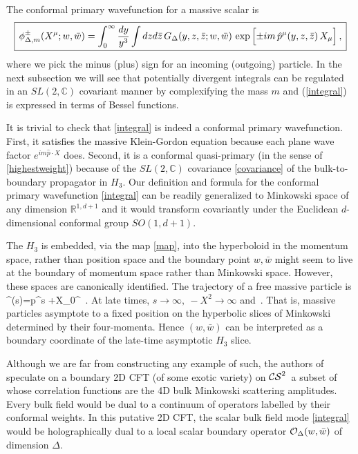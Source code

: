 \documentclass[12pt]{article}
\def\cst{${\cal CS}^2$}
\numberwithin{equation}{section}
\def\be#1\ee{\begin{align}#1\end{align}}
\begin{document}
The conformal primary wavefunction for a massive scalar is 
\begin{align}\label{integral}
\boxed{\,
\phi^\pm_{\Delta,m} (X^\mu; w, \bar w) 
= \int_0^\infty   {dy \over y^3} \int dzd\bar z  \, 
G_\Delta (y ,z,\bar z;w, \bar w)  \,
\exp\Big[   { \pm i m \,\hat p^\mu(y,z,\bar z)\, X_\mu}   \Big]\,,\,}
\end{align}
where we pick the  minus (plus) sign for an incoming (outgoing) particle.   In the next subsection we will see that potentially divergent integrals can be regulated in an $SL(2,\mathbb{C})$ covariant manner by complexifying the mass $m$ and (\ref{integral}) is expressed in terms of Bessel functions.


It is trivial to check that \eqref{integral} is indeed a conformal primary wavefunction. First, it satisfies the massive Klein-Gordon equation because each plane wave factor $e^{i m \hat p\cdot X}$ does. Second, it is a conformal quasi-primary (in the sense of \eqref{highestweight}) because of the $SL(2,\mathbb{C})$ covariance \eqref{covariance} of the  bulk-to-boundary propagator in $H_3$.    
Our definition and formula for the conformal primary wavefunction \eqref{integral} can be readily  generalized to Minkowski space of any dimension $\mathbb{R}^{1,d+1}$ and it would transform covariantly under the Euclidean $d$-dimensional conformal group $SO(1,d+1)$.


The $H_3$  is embedded, via the map \eqref{map}, into the hyperboloid in the momentum space, rather than position space and the boundary point $w,\bar w$ might seem to live at the boundary of momentum space rather than Minkowski space. However, these spaces are canonically identified. The trajectory of a free massive particle is 
\be X^\mu(s)=\hat p^\mu s +X_0^\mu\, .\ee
At late times, $s \to \infty,~-X^2\to \infty$ and 
\be {X^\mu \over \sqrt{-X^2}}\,.\ee
That is, massive particles asymptote to a fixed position on the hyperbolic slices of Minkowski determined by their four-momenta. Hence $(w,\bar w)$ can be interpreted as a boundary coordinate of the late-time asymptotic $H_3$ slice.

Although we are far from constructing any example of such, the authors of \cite{deBoer:2003vf} speculate on a boundary 2D CFT (of some exotic variety) on \cst\ a subset of whose correlation functions are the 4D bulk Minkowski scattering amplitudes. Every bulk field would be dual  to a continuum of operators labelled by their conformal weights. In this putative 2D CFT, the scalar bulk field mode \eqref{integral} would be holographically dual to a local scalar boundary operator  ${\cal O}_{\Delta}(w,\bar w)$ of dimension $\Delta$. 
\end{document}
